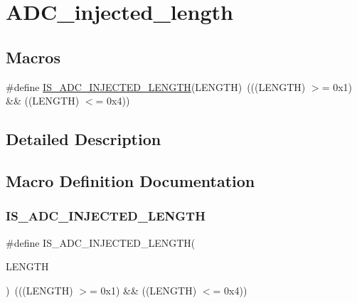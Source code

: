 \hypertarget{group___a_d_c__injected__length}{}\section{A\+D\+C\+\_\+injected\+\_\+length}
\label{group___a_d_c__injected__length}
\subsection*{Macros}
\begin{DoxyCompactItemize}
\item 
\#define \mbox{\hyperlink{group___a_d_c__injected__length_gaecdddab7424a697722683296ca70e176}{I\+S\+\_\+\+A\+D\+C\+\_\+\+I\+N\+J\+E\+C\+T\+E\+D\+\_\+\+L\+E\+N\+G\+TH}}(L\+E\+N\+G\+TH)~(((L\+E\+N\+G\+TH) $>$= 0x1) \&\& ((\+L\+E\+N\+G\+T\+H) $<$= 0x4))
\end{DoxyCompactItemize}


\subsection{Detailed Description}


\subsection{Macro Definition Documentation}
\mbox{\label{group___a_d_c__injected__length_gaecdddab7424a697722683296ca70e176}} 
\subsubsection{\texorpdfstring{IS\_ADC\_INJECTED\_LENGTH}{IS\_ADC\_INJECTED\_LENGTH}}
{\footnotesize\ttfamily \#define I\+S\+\_\+\+A\+D\+C\+\_\+\+I\+N\+J\+E\+C\+T\+E\+D\+\_\+\+L\+E\+N\+G\+TH(\begin{DoxyParamCaption}\item[{}]{L\+E\+N\+G\+TH }\end{DoxyParamCaption})~(((L\+E\+N\+G\+TH) $>$= 0x1) \&\& ((\+L\+E\+N\+G\+T\+H) $<$= 0x4))}

